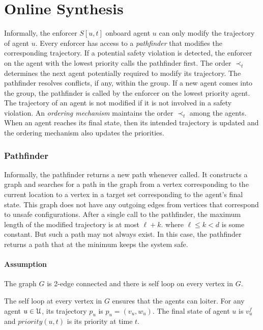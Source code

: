 \section{Online Synthesis}
Informally, the enforcer $S[u,t]$ onboard agent $u$ can only modify the trajectory of agent $u$. 
Every enforcer has access to a \emph{pathfinder} that modifies the corresponding trajectory. If a potential safety violation is detected, the enforcer on the agent with the lowest priority calls the pathfinder first. The order $\prec_t$ determines the next agent potentially required to modify its trajectory.
The pathfinder resolves conflicts, if any, within the group. If a new agent comes into the group, the pathfinder is called by the enforcer on the lowest priority agent. The trajectory of an agent is not modified if it is not involved in a safety violation. 
An \emph{ordering mechanism} maintains the order $\prec_t$ among the agents. When an agent reaches its final state, then its intended trajectory is updated and the ordering mechanism also updates the priorities.

\subsubsection*{Pathfinder}

Informally, the pathfinder returns a new path whenever called. It constructs a graph and searches for a path in the graph from a vertex corresponding to the current location to a vertex in a target set corresponding to the agent's final state. This graph does not have any outgoing edges from vertices that correspond to unsafe configurations. After a single call to the pathfinder, the maximum length of the modified trajectory is at most $\ell + k$. where $\ell \leq k < d$ is some constant. But such a path may not always exist. In this case, the pathfinder returns a path that at the minimum keeps the system safe.

\paragraph{Assumption}
The graph $G$ is 2-edge connected  and there is self loop on every vertex in $G$.

The self loop at every vertex in $G$ ensures that the agents can loiter.
For any agent $u \in \mathcal{U}$, its trajectory $p_u$ is $p_u=(v_u,w_u)$.
The final state of agent $u$ is $v_u^f$ and $priority(u,t)$ is its priority at time $t$. 


